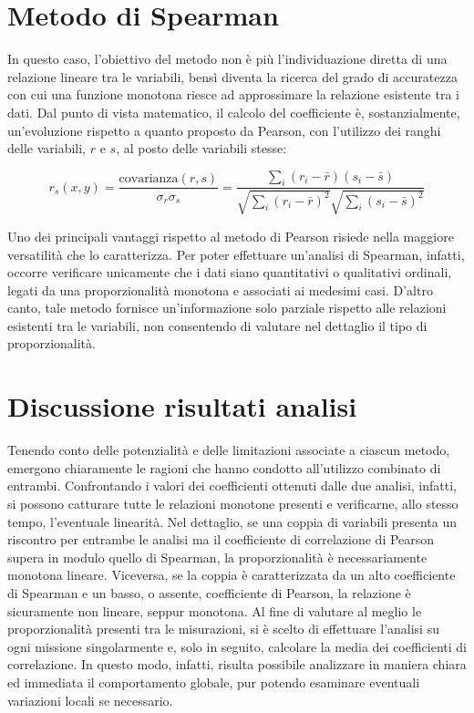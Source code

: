\section{Metodo di Spearman}

In questo caso, l'obiettivo del metodo non è più l'individuazione diretta di una relazione lineare tra le variabili, bensì diventa la ricerca del grado di accuratezza con cui una funzione monotona riesce ad approssimare la relazione esistente tra i dati. Dal punto di vista matematico, il calcolo del coefficiente è, sostanzialmente, un'evoluzione rispetto a quanto proposto da Pearson, con l'utilizzo dei ranghi delle variabili, $r$ e $s$, al posto delle variabili stesse: 

    \begin{equation}
        \displaystyle r_{s} (x, y) = \frac{\text{covarianza}(r, s)}{\sigma_{r} \sigma_{s}} = \frac{\sum_{i} (r_{i} - \bar{r})(s_{i} - \bar{s})}{\sqrt{\sum_{i}(r_{i} - \bar{r})^{2}} \sqrt{\sum_{i}(s_{i} - \bar{s})^{2}}}
        \label{eq:spearman}
    \end{equation}

Uno dei principali vantaggi rispetto al metodo di Pearson risiede nella maggiore versatilità che lo caratterizza. Per poter effettuare un'analisi di Spearman, infatti, occorre verificare unicamente che i dati siano quantitativi o qualitativi ordinali, legati da una proporzionalità monotona e associati ai medesimi casi. D'altro canto, tale metodo fornisce un'informazione solo parziale rispetto alle relazioni esistenti tra le variabili, non consentendo di valutare nel dettaglio il tipo di proporzionalità.  

\section{Discussione risultati analisi}

Tenendo conto delle potenzialità e delle limitazioni associate a ciascun metodo, emergono chiaramente le ragioni che hanno condotto all'utilizzo combinato di entrambi. Confrontando i valori dei coefficienti ottenuti dalle due analisi, infatti, si possono catturare tutte le relazioni monotone presenti e verificarne, allo stesso tempo, l'eventuale linearità. Nel dettaglio, se una coppia di variabili presenta un riscontro per entrambe le analisi ma il coefficiente di correlazione di Pearson supera in modulo quello di Spearman, la proporzionalità è necessariamente monotona lineare. Viceversa, se la coppia è caratterizzata da un alto coefficiente di Spearman e un basso, o assente, coefficiente di Pearson, la relazione è sicuramente non lineare, seppur monotona. Al fine di valutare al meglio le proporzionalità presenti tra le misurazioni, si è scelto di effettuare l'analisi su ogni missione singolarmente e, solo in seguito, calcolare la media dei coefficienti di correlazione. In questo modo, infatti, risulta possibile analizzare in maniera chiara ed immediata il comportamento globale, pur potendo esaminare eventuali variazioni locali se necessario.

